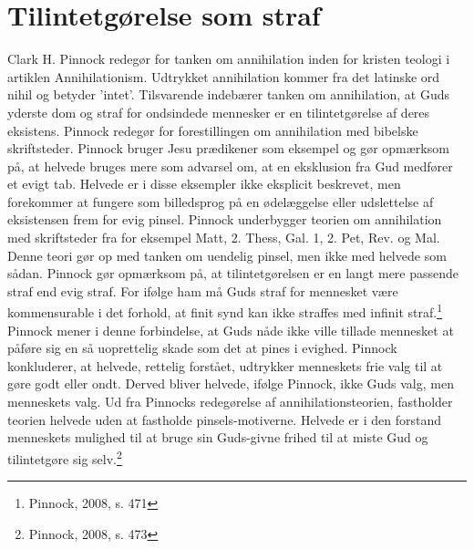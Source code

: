 \section{Tilintetgørelse som straf}
Clark H. Pinnock redegør for tanken om annihilation inden for kristen teologi i artiklen Annihilationism. Udtrykket annihilation kommer fra det latinske ord nihil og betyder ’intet’. Tilsvarende indebærer tanken om annihilation, at Guds yderste dom og straf for ondsindede mennesker er en tilintetgørelse af deres eksistens. Pinnock redegør for forestillingen om annihilation med bibelske skriftsteder. Pinnock bruger Jesu prædikener som eksempel og gør opmærksom på, at helvede bruges mere som advarsel om, at en eksklusion fra Gud medfører et evigt tab. Helvede er i disse eksempler ikke eksplicit beskrevet, men forekommer at fungere som billedsprog på en ødelæggelse eller udslettelse af eksistensen frem for evig pinsel. Pinnock underbygger teorien om annihilation med skriftsteder fra for eksempel Matt, 2. Thess, Gal. 1, 2. Pet, Rev. og Mal. Denne teori gør op med tanken om uendelig pinsel, men ikke med helvede som sådan. Pinnock gør opmærksom på, at tilintetgørelsen er en langt mere passende straf end evig straf. For ifølge ham må Guds straf for mennesket være kommensurable i det forhold, at finit synd kan ikke straffes med infinit straf.\footnote{Pinnock, 2008, s. 471} Pinnock mener i denne forbindelse, at Guds nåde ikke ville tillade mennesket at påføre sig en så uoprettelig skade som det at pines i evighed. Pinnock konkluderer, at helvede, rettelig forstået, udtrykker menneskets frie valg til at gøre godt eller ondt. Derved bliver helvede, ifølge Pinnock, ikke Guds valg, men menneskets valg. Ud fra Pinnocks redegørelse af annihilationsteorien, fastholder teorien helvede uden at fastholde pinsels-motiverne. Helvede er i den forstand menneskets mulighed til at bruge sin Guds-givne frihed til at miste Gud og tilintetgøre sig selv.\footnote{Pinnock, 2008, s. 473}

